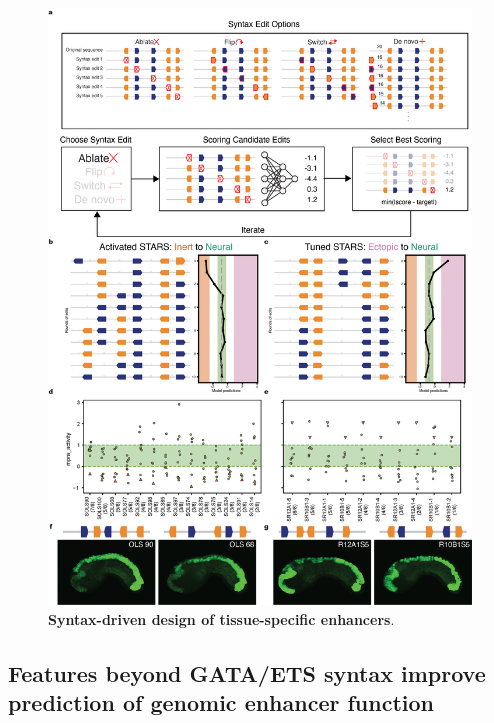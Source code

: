 \clearpage

\begin{figure}[!htbp]
    \centering
    \includegraphics[height=0.75\textheight, keepaspectratio]{2_figures-and-files/Fig4.png}
    \caption[Syntax-driven design of tissue-specific enhancers.]{\textbf{Syntax-driven design of tissue-specific enhancers}.}
    \label{fig:2 Figure 4}
\end{figure}

\clearpage


\subsection{Features beyond GATA/ETS syntax improve prediction of genomic enhancer function}

